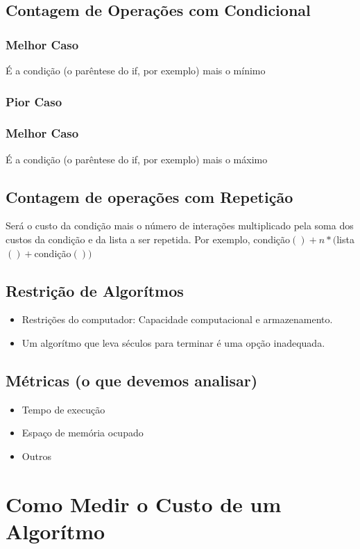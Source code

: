 \documentclass[12pt]{article}
\begin{document}
    \subsection{Contagem de Operações com Condicional}
        \subsubsection{Melhor Caso} É a condição (o parêntese do if, por exemplo) mais o mínimo
        \subsubsection{Pior Caso}
        \subsubsection{Melhor Caso} É a condição (o parêntese do if, por exemplo) mais o máximo
    \subsection{Contagem de operações com Repetição}
        Será o custo da condição mais o número de interações multiplicado pela soma dos custos da condição e da lista a ser repetida.
        Por exemplo, condição$() + n*($lista$()+$condição$())$
    \subsection{Restrição de Algorítmos}
        \begin{itemize}
            \item Restrições do computador: Capacidade computacional e armazenamento.
            \item Um algorítmo que leva séculos para terminar é uma opção inadequada.
        \end{itemize}
    \subsection{Métricas (o que devemos analisar)}
        \begin{itemize}
            \item Tempo de execução
            \item Espaço de memória ocupado
            \item Outros
        \end{itemize}
\section{Como Medir o Custo de um Algorítmo}
\end{document}
